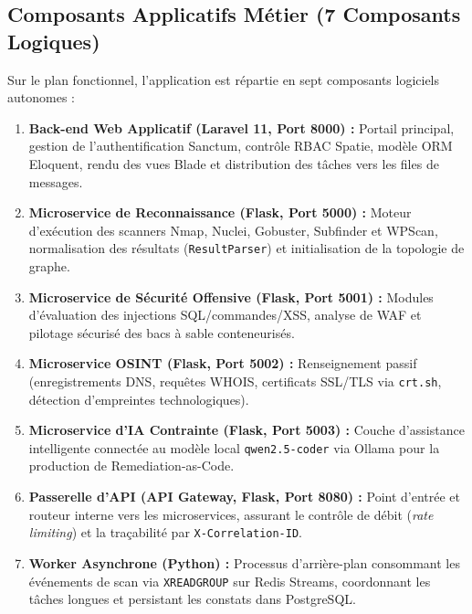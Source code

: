 \subsection{Composants Applicatifs M\'etier (7 Composants Logiques)}
\par Sur le plan fonctionnel, l'application est r\'epartie en sept composants logiciels autonomes :
\begin{enumerate}
    \item \textbf{Back-end Web Applicatif (Laravel 11, Port 8000) :} Portail principal, gestion de l'authentification Sanctum, contr\^ole RBAC Spatie, mod\`ele ORM Eloquent, rendu des vues Blade et distribution des t\^aches vers les files de messages.
    \item \textbf{Microservice de Reconnaissance (Flask, Port 5000) :} Moteur d'ex\'ecution des scanners Nmap, Nuclei, Gobuster, Subfinder et WPScan, normalisation des r\'esultats (\texttt{ResultParser}) et initialisation de la topologie de graphe.
    \item \textbf{Microservice de S\'ecurit\'e Offensive (Flask, Port 5001) :} Modules d'\'evaluation des injections SQL/commandes/XSS, analyse de WAF et pilotage s\'ecuris\'e des bacs \`a sable conteneuris\'es.
    \item \textbf{Microservice OSINT (Flask, Port 5002) :} Renseignement passif (enregistrements DNS, requ\^etes WHOIS, certificats SSL/TLS via \texttt{crt.sh}, d\'etection d'empreintes technologiques).
    \item \textbf{Microservice d'IA Contrainte (Flask, Port 5003) :} Couche d'assistance intelligente connect\'ee au mod\`ele local \texttt{qwen2.5-coder} via Ollama pour la production de Remediation-as-Code.
    \item \textbf{Passerelle d'API (API Gateway, Flask, Port 8080) :} Point d'entr\'ee et routeur interne vers les microservices, assurant le contr\^ole de d\'ebit (\textit{rate limiting}) et la tra\c{c}abilit\'e par \texttt{X-Correlation-ID}.
    \item \textbf{Worker Asynchrone (Python) :} Processus d'arri\`ere-plan consommant les \'ev\'enements de scan via \texttt{XREADGROUP} sur Redis Streams, coordonnant les t\^aches longues et persistant les constats dans PostgreSQL.
\end{enumerate}

